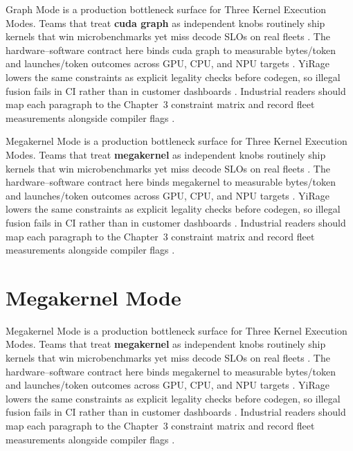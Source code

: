 Graph Mode is a production bottleneck surface for Three Kernel Execution Modes. Teams that treat \textbf{cuda graph} as independent knobs routinely ship kernels that win microbenchmarks yet miss decode SLOs on real fleets \citep{patel2025llminference,nvidia2022hopper}. The hardware--software contract here binds cuda graph to measurable bytes/token and launches/token outcomes across GPU, CPU, and NPU targets \citep{taxbreak2026,semianalysis2024tma}. YiRage lowers the same constraints as explicit legality checks before codegen, so illegal fusion fails in CI rather than in customer dashboards \citep{memoryfloor2026,amd2024xdna}. Industrial readers should map each paragraph to the Chapter~3 constraint matrix and record fleet measurements alongside compiler flags \citep{nvidia2022hopper,amd2024aie}.

Megakernel Mode is a production bottleneck surface for Three Kernel Execution Modes. Teams that treat \textbf{megakernel} as independent knobs routinely ship kernels that win microbenchmarks yet miss decode SLOs on real fleets \citep{taxbreak2026,semianalysis2024tma}. The hardware--software contract here binds megakernel to measurable bytes/token and launches/token outcomes across GPU, CPU, and NPU targets \citep{memoryfloor2026,amd2024xdna}. YiRage lowers the same constraints as explicit legality checks before codegen, so illegal fusion fails in CI rather than in customer dashboards \citep{nvidia2022hopper,amd2024aie}. Industrial readers should map each paragraph to the Chapter~3 constraint matrix and record fleet measurements alongside compiler flags \citep{semianalysis2024tma,dlbook}.

\section{Megakernel Mode}
\label{sec:megakernel_mode}

Megakernel Mode is a production bottleneck surface for Three Kernel Execution Modes. Teams that treat \textbf{megakernel} as independent knobs routinely ship kernels that win microbenchmarks yet miss decode SLOs on real fleets \citep{memoryfloor2026,amd2024xdna}. The hardware--software contract here binds megakernel to measurable bytes/token and launches/token outcomes across GPU, CPU, and NPU targets \citep{nvidia2022hopper,amd2024aie}. YiRage lowers the same constraints as explicit legality checks before codegen, so illegal fusion fails in CI rather than in customer dashboards \citep{semianalysis2024tma,dlbook}. Industrial readers should map each paragraph to the Chapter~3 constraint matrix and record fleet measurements alongside compiler flags \citep{amd2024xdna,dao2022flashattention}.

